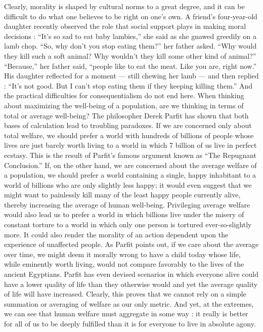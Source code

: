 \documentclass[a4paper,14pt]{extbook}
\begin{document}
Clearly, morality is shaped by cultural norms to a great degree, and it can be difficult to do what one believes to be right on one's own.
A friend's four-year-old daughter recently observed the role that social support plays in making moral decisions :
``It's so sad to eat baby lambies,'' she said as she gnawed greedily on a lamb chop.
``So, why don't you stop eating them?'' her father asked.
``Why would they kill such a soft animal?
Why wouldn't they kill some other kind of animal?''
``Because,'' her father said, ``people like to eat the meat. Like you are, right now.''
His daughter reflected for a moment --- still chewing her lamb --- and then replied :
``It's not good.
But I can't stop eating them if they keeping killing them.''
And the practical difficulties for consequentialism do not end here.
When thinking about maximizing the well-being of a population, are we thinking in terms of total or average well-being?
The philosopher Derek Parfit has shown that both bases of calculation lead to troubling paradoxes.
If we are concerned only about total welfare, we should prefer a world with hundreds of billions of people whose lives are just barely worth living to a world in which 7 billion of us live in perfect ecstasy.
This is the result of Parfit's famous argument known as ``The Repugnant Conclusion.''
If, on the other hand, we are concerned about the average welfare of a population, we should prefer a world containing a single, happy inhabitant to a world of billions who are only slightly less happy;
it would even suggest that we might want to painlessly kill many of the least happy people currently alive, thereby increasing the average of human well-being.
Privileging average welfare would also lead us to prefer a world in which billions live under the misery of constant torture to a world in which only one person is tortured ever-so-slightly more.
It could also render the morality of an action dependent upon the experience of unaffected people.
As Parfit points out, if we care about the average over time, we might deem it morally wrong to have a child today whose life, while eminently worth living, would not compare favorably to the lives of the ancient Egyptians.
Parfit has even devised scenarios in which everyone alive could have a lower quality of life than they otherwise would and yet the average quality of life will have increased.
Clearly, this proves that we cannot rely on a simple summation or averaging of welfare as our only metric.
And yet, at the extremes, we can see that human welfare must aggregate in some way :
it really is better for all of us to be deeply fulfilled than it is for everyone to live in absolute agony.
\end{document}
